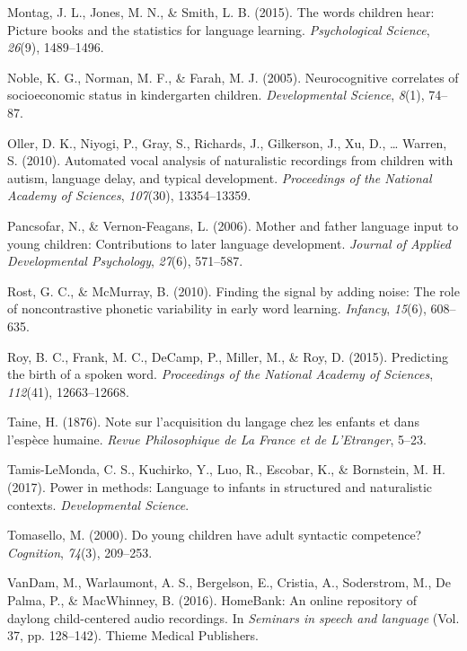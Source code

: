 \documentclass[floatsintext,man]{apa6}
\theoremstyle{definition}
\theoremstyle{definition}
\theoremstyle{definition}
\theoremstyle{remark}
\begin{document}
\hypertarget{ref-montag2015words}{}
Montag, J. L., Jones, M. N., \& Smith, L. B. (2015). The words children
hear: Picture books and the statistics for language learning.
\emph{Psychological Science}, \emph{26}(9), 1489--1496.

\hypertarget{ref-noble2005neurocognitive}{}
Noble, K. G., Norman, M. F., \& Farah, M. J. (2005). Neurocognitive
correlates of socioeconomic status in kindergarten children.
\emph{Developmental Science}, \emph{8}(1), 74--87.

\hypertarget{ref-oller2010automated}{}
Oller, D. K., Niyogi, P., Gray, S., Richards, J., Gilkerson, J., Xu, D.,
\ldots{} Warren, S. (2010). Automated vocal analysis of naturalistic
recordings from children with autism, language delay, and typical
development. \emph{Proceedings of the National Academy of Sciences},
\emph{107}(30), 13354--13359.

\hypertarget{ref-pancsofar2006mother}{}
Pancsofar, N., \& Vernon-Feagans, L. (2006). Mother and father language
input to young children: Contributions to later language development.
\emph{Journal of Applied Developmental Psychology}, \emph{27}(6),
571--587.

\hypertarget{ref-rost2010finding}{}
Rost, G. C., \& McMurray, B. (2010). Finding the signal by adding noise:
The role of noncontrastive phonetic variability in early word learning.
\emph{Infancy}, \emph{15}(6), 608--635.

\hypertarget{ref-roy2015predicting}{}
Roy, B. C., Frank, M. C., DeCamp, P., Miller, M., \& Roy, D. (2015).
Predicting the birth of a spoken word. \emph{Proceedings of the National
Academy of Sciences}, \emph{112}(41), 12663--12668.

\hypertarget{ref-taine1876note}{}
Taine, H. (1876). Note sur l'acquisition du langage chez les enfants et
dans l'espèce humaine. \emph{Revue Philosophique de La France et de
L'Etranger}, 5--23.

\hypertarget{ref-tamis2017power}{}
Tamis-LeMonda, C. S., Kuchirko, Y., Luo, R., Escobar, K., \& Bornstein,
M. H. (2017). Power in methods: Language to infants in structured and
naturalistic contexts. \emph{Developmental Science}.

\hypertarget{ref-tomasello2000young}{}
Tomasello, M. (2000). Do young children have adult syntactic competence?
\emph{Cognition}, \emph{74}(3), 209--253.

\hypertarget{ref-vandam2016homebank}{}
VanDam, M., Warlaumont, A. S., Bergelson, E., Cristia, A., Soderstrom,
M., De Palma, P., \& MacWhinney, B. (2016). HomeBank: An online
repository of daylong child-centered audio recordings. In \emph{Seminars
in speech and language} (Vol. 37, pp. 128--142). Thieme Medical
Publishers.
\end{document}
